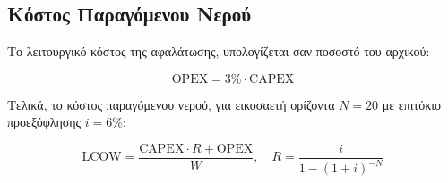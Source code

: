 \subsection{Κόστος Παραγόμενου Νερού}

Το λειτουργικό κόστος της αφαλάτωσης, υπολογίζεται σαν ποσοστό του αρχικού:

\begin{equation}\label{eq:OPEX}
	\text{OPEX}=3\%\cdot \text{CAPEX}
\end{equation}

Τελικά, το κόστος παραγόμενου νερού, για εικοσαετή ορίζοντα \(Ν=20\) με
επιτόκιο προεξόφλησης \(i=6\%\):

\begin{equation}\label{eq:LCOW}
	\text{LCOW}= \frac{\text{CAPEX}\cdot R + \text{OPEX}}{W}, \quad R=\frac{i}{1-(1+i)^{-N}}
\end{equation}

